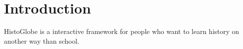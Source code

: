 \section{Introduction}
HistoGlobe is a interactive framework for people who want to learn history on another way than school. 


\newpage